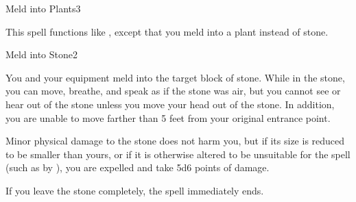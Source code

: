 \begin{spellsection}{Meld into Plants}{3}
    \begin{spellheader}
    \end{spellheader}
    \begin{spellcontent}
        \begin{spelltargetinginfo}
        \end{spelltargetinginfo}
        \begin{spelleffects}
            \spellspecial This spell functions like , except that you meld into a plant instead of stone.
        \end{spelleffects}
    \end{spellcontent}
    \begin{spellfooter}
        \miscastexplode
    \end{spellfooter}
\end{spellsection}

\begin{spellsection}{Meld into Stone}{2}
    \begin{spellheader}
    \end{spellheader}
    \begin{spellcontent}
        \begin{spelltargetinginfo}
        \end{spelltargetinginfo}
        \begin{spelleffects}
            \spelleffect You and your equipment meld into the target block of stone. While in the stone, you can move, breathe, and speak as if the stone was air, but you cannot see or hear out of the stone unless you move your head out of the stone. In addition, you are unable to move farther than 5 feet from your original entrance point.

            Minor physical damage to the stone does not harm you, but if its size is reduced to be smaller than yours, or if it is otherwise altered to be unsuitable for the spell (such as by ), you are expelled and take 5d6 points of damage.

            If you leave the stone completely, the spell immediately ends.

            \spelldur \durlong
        \end{spelleffects}
    \end{spellcontent}
    \begin{spellfooter}
        \miscastexplode
    \end{spellfooter}
\end{spellsection}

